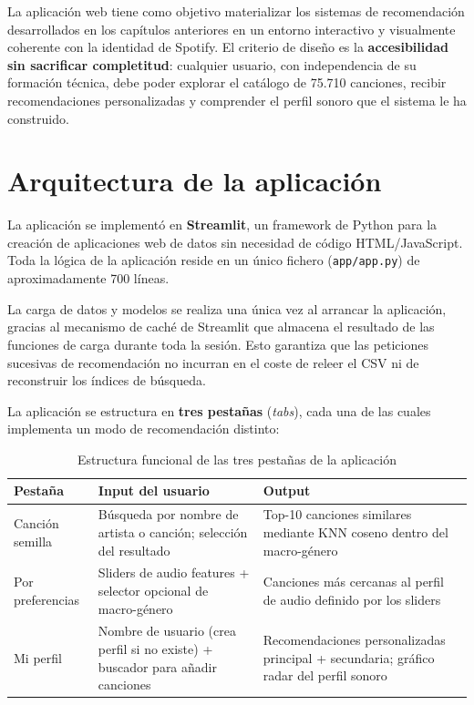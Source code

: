 \documentclass[12pt, a4paper]{book}
\theoremstyle{definition}
\begin{document}
La aplicación web tiene como objetivo materializar los sistemas de
recomendación desarrollados en los capítulos anteriores en un entorno
interactivo y visualmente coherente con la identidad de Spotify. El criterio
de diseño es la \textbf{accesibilidad sin sacrificar completitud}: cualquier
usuario, con independencia de su formación técnica, debe poder explorar el
catálogo de 75.710 canciones, recibir recomendaciones personalizadas y
comprender el perfil sonoro que el sistema le ha construido.

\section{Arquitectura de la aplicación}
\label{sec:arquitectura}

La aplicación se implementó en \textbf{Streamlit}, un framework de Python
para la creación de aplicaciones web de datos sin necesidad de código
HTML/JavaScript. Toda la lógica de la aplicación reside en un único fichero
(\texttt{app/app.py}) de aproximadamente 700 líneas.

La carga de datos y modelos se realiza una única vez al arrancar la
aplicación, gracias al mecanismo de caché de Streamlit que almacena el
resultado de las funciones de carga durante toda la sesión. Esto garantiza
que las peticiones sucesivas de recomendación no incurran en el coste de
releer el CSV ni de reconstruir los índices de búsqueda.

La aplicación se estructura en \textbf{tres pestañas} (\textit{tabs}),
cada una de las cuales implementa un modo de recomendación distinto:

\begin{table}[H]
\centering
\caption{Estructura funcional de las tres pestañas de la aplicación}
\label{tab:pestanas}
\small
\begin{tabular}{p{3.5cm} p{4.5cm} p{5cm}}
\toprule
\textbf{Pestaña} & \textbf{Input del usuario} & \textbf{Output} \\
\midrule
Canción semilla &
  Búsqueda por nombre de artista o canción; selección del resultado &
  Top-10 canciones similares mediante KNN coseno dentro del macro-género \\
Por preferencias &
  Sliders de audio features + selector opcional de macro-género &
  Canciones más cercanas al perfil de audio definido por los sliders \\
Mi perfil &
  Nombre de usuario (crea perfil si no existe) + buscador para añadir canciones &
  Recomendaciones personalizadas principal + secundaria; gráfico radar del perfil sonoro \\
\bottomrule
\end{tabular}
\end{table}
\end{document}
